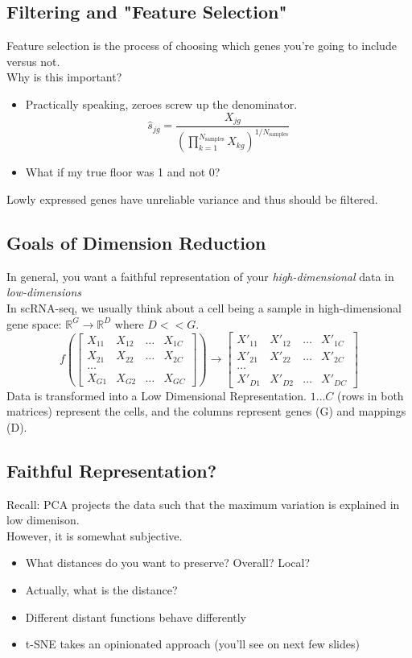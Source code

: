 \documentclass[10pt]{article}
\begin{document}
\subsection*{Filtering and "Feature Selection"}
Feature selection is the process of choosing which genes you're going to include versus not.\\
Why is this important?
\begin{itemize}
    \item Practically speaking, zeroes screw up the denominator.
    \[\hat s_{jg} = \frac{X_{jg}}{\left(\prod_{k = 1}^{N_{\text{samples}}} X_{kg}\right)^{1/N_{\text{samples}}}}\]
    \item What if my true floor was 1 and not 0?
\end{itemize}
Lowly expressed genes have unreliable variance and thus should be filtered.

\subsection*{Goals of Dimension Reduction}
In general, you want a faithful representation of your \textit{high-dimensional} data in \textit{low-dimensions}\\
In scRNA-seq, we usually think about a cell being a sample in high-dimensional gene space: $\mathbb{R}^G \rightarrow \mathbb{R}^D$ where $D << G$.
\[f\left(\begin{bmatrix}X_{11} & X_{12} & \dots & X_{1C} \\ X_{21} & X_{22} & \dots & X_{2C} \\ \dots \\ X_{G1} & X_{G2} & \dots & X_{GC}\end{bmatrix}\right) \rightarrow \begin{bmatrix}X'_{11} & X'_{12} & \dots & X'_{1C} \\ X'_{21} & X'_{22} & \dots & X'_{2C} \\ \dots \\ X'_{D1} & X'_{D2} & \dots & X'_{DC}\end{bmatrix}\]
Data is transformed into a Low Dimensional Representation.  $1\dots C$ (rows in both matrices) represent the cells, and the columns represent genes (G) and mappings (D).

\subsection*{Faithful Representation?}
Recall: PCA projects the data such that the maximum variation is explained in low dimenison.\\
However, it is somewhat subjective.
\begin{itemize}
    \item What distances do you want to preserve?  Overall?  Local?
    \item Actually, what is the distance?
    \item Different distant functions behave differently
    \item t-SNE takes an opinionated approach (you'll see on next few slides)
\end{itemize}
\end{document}
